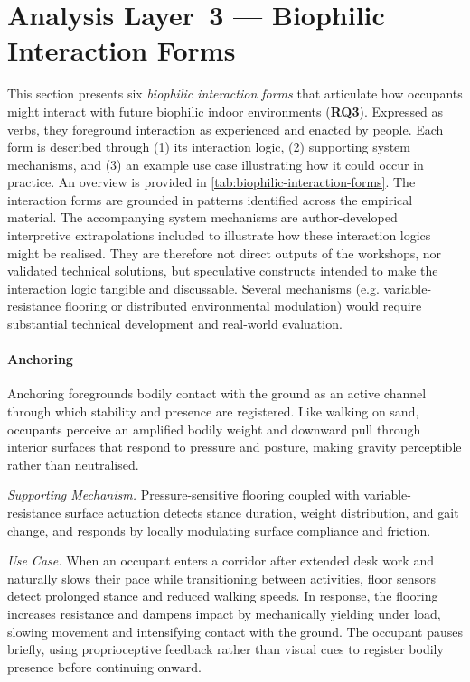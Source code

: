 \section{Analysis Layer~3 --- Biophilic Interaction Forms}
\label{sec:ch5-layer3}

This section presents six \emph{biophilic interaction forms} that articulate how occupants might interact with future biophilic indoor environments (\textbf{RQ3}). Expressed as verbs, they foreground interaction as experienced and enacted by people. Each form is described through (1) its interaction logic, (2) supporting system mechanisms, and (3) an example use case illustrating how it could occur in practice. An overview is provided in \autoref{tab:biophilic-interaction-forms}. The interaction forms are grounded in patterns identified across the empirical material. The accompanying system mechanisms are author-developed interpretive extrapolations included to illustrate how these interaction logics might be realised. They are therefore not direct outputs of the workshops, nor validated technical solutions, but speculative constructs intended to make the interaction logic tangible and discussable. Several mechanisms (e.g. variable-resistance flooring or distributed environmental modulation) would require substantial technical development and real-world evaluation.

\paragraph{\textbf{Anchoring}}
Anchoring foregrounds bodily contact with the ground as an active channel through which stability and presence are registered. Like walking on sand, occupants perceive an amplified bodily weight and downward pull through interior surfaces that respond to pressure and posture, making gravity perceptible rather than neutralised. 

\emph{Supporting Mechanism.} Pressure-sensitive flooring coupled with variable-resistance surface actuation detects stance duration, weight distribution, and gait change, and responds by locally modulating surface compliance and friction.

\emph{Use Case.} When an occupant enters a corridor after extended desk work and naturally slows their pace while transitioning between activities, floor sensors detect prolonged stance and reduced walking speeds. In response, the flooring increases resistance and dampens impact by mechanically yielding under load, slowing movement and intensifying contact with the ground. The occupant pauses briefly, using proprioceptive feedback rather than visual cues to register bodily presence before continuing onward.

